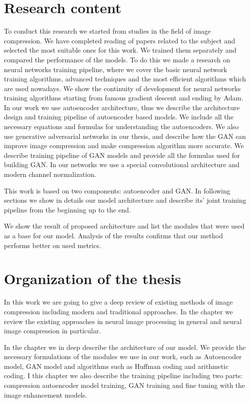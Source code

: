 \section{Research content}

To conduct this research we started from studies in the field of image compression. We have completed reading of papers related to the subject and selected the most suitable ones for this work. We trained them separately and compared the performance of the models. To do this we made a research on neural networks training pipeline, where we cover the basic neural network training algorithms, advanced techniques and the most efficient algorithms which are used nowadays. We show the continuity of development for neural networks training algorithms starting from famous gradient descent and ending by Adam. In our work we use autoencoder architecture, thus we describe the architecture design and training pipeline of autoencoder based models. We include all the necessary equations and formulas for understanding the autoencoders. We also use generative adversarial networks in our thesis, and describe how the GAN can improve image compression and make compression algorithm more accurate. We describe training pipeline of GAN models and provide all the formulas used for building GAN. In our networks we use a special convolutional architecture and modern channel normalization.

This work is based on two components: autoencoder and GAN. In following sections we show in details our model architecture and describe its' joint training pipeline from the beginning up to the end.

We show the result of proposed architecture and list the modules that were used as a base for our model. Analysis of the results confirms that our method performs better on used metrics.

\section{Organization of the thesis}

In this work we are going to give a deep review of existing methods of image compression including modern and traditional approaches. In the chapter  we review the existing approaches in neural image processing in general and neural image compression in particular.

In the chapter  we in deep describe the architecture of our model. We provide the necessary formulations of the modules we use in our work, such as Autoencoder model, GAN model and algorithms such as Huffman coding and arithmetic coding. I this chapter we also describe the training pipeline including two parts: compression autoencoder model training, GAN training and fine tuning with the image enhancement models.

